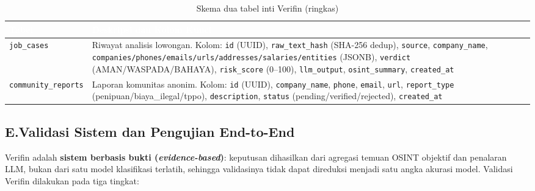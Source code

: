 \documentclass[12pt,a4paper]{article}
\newcommand{\thead}[1]{\textcolor{white}{\textbf{#1}}}
\begin{document}
\begin{adjustwidth}{0.50cm}{0pt}
\begin{table}[H]
\centering
\caption{Skema dua tabel inti Verifin (ringkas)}
\label{tab:ddl-schema}
\small
\begin{tabularx}{\linewidth}{@{}p{3.5cm}Y@{}}
\toprule
{}\thead{Tabel} & \thead{Deskripsi dan Kolom Kunci} \\
\midrule
{}
\texttt{job\_cases} & Riwayat analisis lowongan. Kolom: \texttt{id} (UUID), \texttt{raw\_text\_hash} (SHA-256 dedup), \texttt{source}, \texttt{company\_name}, \texttt{companies/phones/emails/urls/addresses/salaries/entities} (JSONB), \texttt{verdict} (AMAN/WASPADA/BAHAYA), \texttt{risk\_score} (0--100), \texttt{llm\_output}, \texttt{osint\_summary}, \texttt{created\_at} \\
\texttt{community\_reports} & Laporan komunitas anonim. Kolom: \texttt{id} (UUID), \texttt{company\_name}, \texttt{phone}, \texttt{email}, \texttt{url}, \texttt{report\_type} (penipuan/biaya\_ilegal/tppo), \texttt{description}, \texttt{status} (pending/verified/rejected), \texttt{created\_at} \\
\bottomrule
\end{tabularx}
\end{table}
\end{adjustwidth}

\subsection*{E.\quad Validasi Sistem dan Pengujian End-to-End}

Verifin adalah \textbf{sistem berbasis bukti (\textit{evidence-based})}: keputusan
dihasilkan dari agregasi temuan OSINT objektif dan penalaran LLM, bukan dari satu model
klasifikasi terlatih, sehingga validasinya tidak
dapat direduksi menjadi satu angka akurasi model. Validasi Verifin dilakukan pada tiga tingkat:
\end{document}
